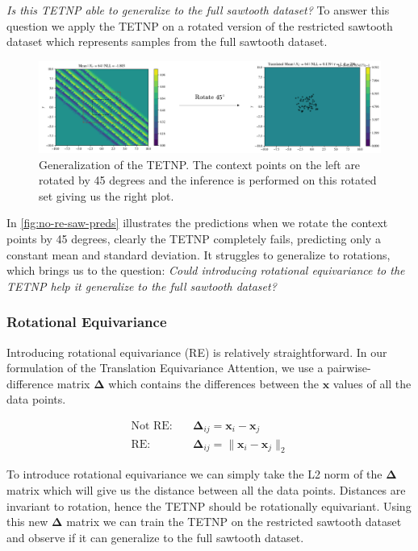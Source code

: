 \documentclass[../../main.tex]{subfiles}
\begin{document}
\emph{Is this TETNP able to generalize to the full sawtooth dataset?} To answer this question we apply the TETNP on a rotated version of the restricted sawtooth dataset which represents samples from the full sawtooth dataset.




\begin{figure}[H]
    \centering
    \includegraphics[width=1\linewidth]{./fig/res-saw/no-re.png}
    \caption{Generalization of the TETNP. The context points on the left are rotated by 45 degrees and  the inference is performed on this rotated set giving us the right plot.}
    \label{fig:no-re-saw-preds}
\end{figure}

In \autoref{fig:no-re-saw-preds}  illustrates the predictions when we rotate the context points by 45 degrees, clearly the TETNP completely fails, predicting only a constant mean and standard deviation. It struggles to generalize to rotations, which brings us to the question: \emph{Could introducing rotational equivariance to the TETNP help it generalize to the full sawtooth dataset?}

\subsubsection{Rotational Equivariance}

Introducing rotational equivariance (RE) is relatively straightforward. In our formulation of the Translation Equivariance Attention, we use a pairwise-difference matrix $\bm{\Delta}$ which contains the differences between the $\bm{x}$ values of all the data points.

\begin{align}
    \text{Not RE}: \quad &\bm{\Delta}_{ij} = \bm{x}_i - \bm{x}_j\\
    \text{RE}: \quad &\bm{\Delta}_{ij} = \|\bm{x}_i - \bm{x}_j\|_2
\end{align}

To introduce rotational equivariance we can simply take the L2 norm of the $\bm{\Delta}$ matrix which will give us the distance between all the data points. Distances are invariant to rotation, hence the TETNP should be rotationally equivariant. Using this new $\bm{\Delta}$ matrix we can train the TETNP on the restricted sawtooth dataset and observe if it can generalize to the full sawtooth dataset.
\end{document}
